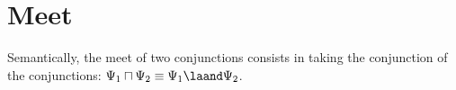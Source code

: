 \section{Meet}

Semantically, the meet of two conjunctions consists in taking the conjunction of the conjunctions:
$\Psi_1 \meet \Psi_2 \equiv \Psi_1 \laand \Psi_2$.
